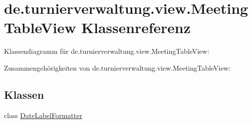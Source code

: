 \hypertarget{classde_1_1turnierverwaltung_1_1view_1_1_meeting_table_view}{}\section{de.\+turnierverwaltung.\+view.\+Meeting\+Table\+View Klassenreferenz}
\label{classde_1_1turnierverwaltung_1_1view_1_1_meeting_table_view}


Klassendiagramm für de.\+turnierverwaltung.\+view.\+Meeting\+Table\+View\+:


Zusammengehörigkeiten von de.\+turnierverwaltung.\+view.\+Meeting\+Table\+View\+:
\subsection*{Klassen}
\begin{DoxyCompactItemize}
\item 
class \hyperlink{classde_1_1turnierverwaltung_1_1view_1_1_meeting_table_view_1_1_date_label_formatter}{Date\+Label\+Formatter}
\end{DoxyCompactItemize}
